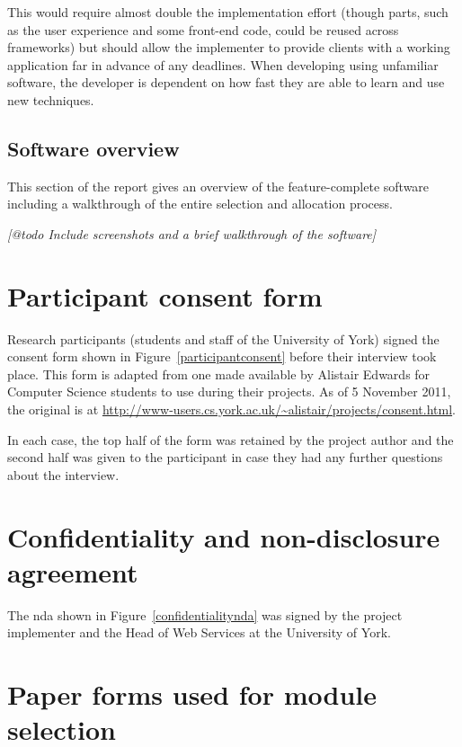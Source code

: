 \documentclass[draft]{scrartcl}
\let\stdsection\section
\renewcommand\section{\clearpage\stdsection}
\begin{document}
This would require almost double the implementation effort (though parts, such
as the user experience and some front-end code, could be reused across
frameworks) but should allow the implementer to provide clients with a working
application far in advance of any deadlines. When developing using unfamiliar
software, the developer is dependent on how fast they are able to learn and
use new techniques.



\subsection{Software overview}

This section of the report gives an overview of the feature-complete software
including a walkthrough of the entire selection and allocation process.

\emph{[@todo Include screenshots and a brief walkthrough of the software]}










\clearpage
\appendix

\stdsection{Participant consent form}
\label{sec:consent}

Research participants (students and staff of the University of York) signed
the consent form shown in Figure~\ref{participantconsent} before their
interview took place. This form is adapted from one made available by Alistair
Edwards for Computer Science students to use during their projects. As of 5
November 2011, the original is at
\url{http://www-users.cs.york.ac.uk/~alistair/projects/consent.html}.

In each case, the top half of the form was retained by the project author and
the second half was given to the participant in case they had any further
questions about the interview.

\stdsection{Confidentiality and non-disclosure agreement}
\label{sec:nda}

The \gls{nda} shown in Figure~\ref{confidentialitynda} was signed by the
project implementer and the Head of Web Services at the University of York.

\stdsection{Paper forms used for module selection}
\label{sec:paperforms}
\end{document}

